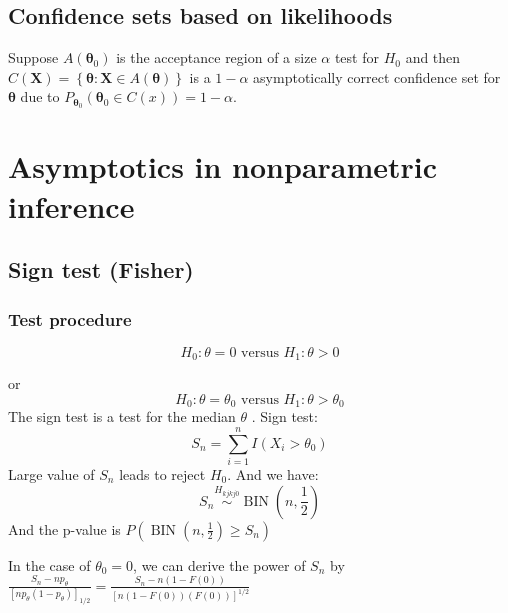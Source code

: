 \documentclass{ctexart}
\begin{document}
\subsection{Confidence sets based on likelihoods}
Suppose \(A(\boldsymbol{\theta}_{0})\) is the acceptance region of a size \(\alpha\) test for \(H_{0}\) and then \(C(\boldsymbol{X})=\left\{ \boldsymbol{\theta}:\boldsymbol{X}\in A(\boldsymbol{\theta}) \right\}\) is a \(1-\alpha\) asymptotically correct confidence set for \(\boldsymbol{\theta}\) due to \(P_{\boldsymbol{\theta}_{0}}(\boldsymbol{\theta}_{0}\in C(x))=1-\alpha\).   
\section{Asymptotics in nonparametric inference}
\subsection{Sign test (Fisher)}
\subsubsection{Test procedure}
\[
H_{0}:\theta=0\text{ versus }H_{1}:\theta>0
\] 

or 
\[
H_{0}:\theta=\theta_{0}\text{ versus }H_{1}:\theta>\theta_{0}
\] 
The sign test is a test for the median \(\theta\) . Sign test: 
\[
S_{n}=\sum_{i=1}^{n} I(X_{i}>\theta_{0})
\] 
Large value of \(S_{n}\) leads to reject \(H_{0}\). And we have: 
\[
S_{n}\overset{H_{kjkj0}}{\sim} \operatorname{BIN}(n,\frac{1}{2})
\]  
And the p-value is \(P(\operatorname{BIN}(n,\frac{1}{2})\ge S_{n})\) 

In the case of \(\theta_{0}=0\), we can derive the power of \(S_{n}\) by \(\frac{S_{n}-np_{\theta}}{[np_{\theta}(1-p_{\theta})]_{1/2}}=\frac{S_{n}-n(1-F(0))}{[n(1-F(0))(F(0))]^{1/2}}\)   
\end{document}
